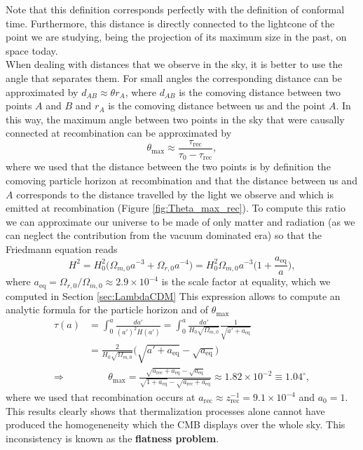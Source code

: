 Note that this definition corresponds perfectly with the definition of conformal time. Furthermore, this distance is directly connected to the lightcone of the point we are studying, being the projection of its maximum size in the past, on space today. \\When dealing with distances that we observe in the sky, it is better to use the angle that separates them. For small angles the corresponding distance can be approximated by $d_{AB}\approx \theta r_{A}$, where $d_{AB}$ is the comoving distance between two points $A$ and $B$ and $r_A$ is the comoving distance between us and the point $A$. In this way, the maximum angle between two points in the sky that were causally connected at recombination can be approximated by
$$\theta_\text{max}\approx\frac{\tau_\text{rec}}{\tau_0-\tau_\text{rec}},$$
where we used that the distance between the two points is by definition the comoving particle horizon at recombination and that the distance between us and $A$ corresponds to the distance travelled by the light we observe and which is emitted at recombination (Figure \ref{fig:Theta_max_rec}). To compute this ratio we can approximate our universe to be made of only matter and radiation (as we can neglect the contribution from the vacuum dominated era) so that the Friedmann equation reads
$$H^2=H_0^2\big(\Omega_{m,0}a^{-3}+\Omega_{r,0}a^{-4}\big)=H_0^2\Omega_{m,0}a^{-3}\bigg(1+\frac{a_\text{eq}}{a}\bigg),
$$
where $a_\text{eq}=\Omega_{r,0}/\Omega_{m,0}\approx2.9\times10^{-4}$ is the scale factor at equality, which we computed in Section \ref{sec:LambdaCDM}  
This expression allows to compute an analytic formula for the particle horizon and of $\theta_\text{max}$
\begin{align*}
    \tau(a)&=\int_0^a \frac{da'}{(a')^2H(a')}=\int_0^a\frac{da'}{H_0\sqrt{\Omega_{m,0}}}\frac{1}{\sqrt{a'+a_\text{eq}}}\\
    &=\frac{2}{H_0\sqrt{\Omega_{m,0}}}\Big(\sqrt{a'+a_\text{eq}}-\sqrt{a_\text{eq}}\Big)\\
    \Rightarrow &\qquad \boxed{\theta_\text{max}=\frac{\sqrt{a_{\text{rec}}+a_{\text{eq}}}-\sqrt{a_{\text{eq}}}}{\sqrt{1+a_\text{eq}}-\sqrt{a_\text{rec}+a_\text{eq}}}\approx1.82 \times 10^{-2}\equiv 1.04 ^\circ},
\end{align*}
where we used that recombination occurs at $a_\text{rec}\approx z_\text{rec}^{-1}= 9.1\times 10^{-4}$ and $a_0=1$.
This results clearly shows that thermalization processes alone cannot have produced the homogeneneity which the CMB displays over the whole sky. This inconsistency is known as the \textbf{flatness problem}.

